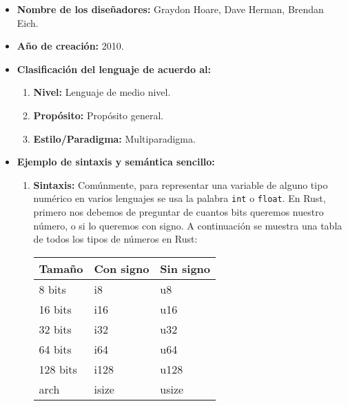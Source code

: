 \documentclass[11pt,letterpaper]{article}
\begin{document}
\begin{enumerate}
\begin{itemize}
\begin{itemize}
                  \item \textbf{Nombre de los diseñadores:} Graydon Hoare, Dave
                        Herman, Brendan Eich.
                  \item \textbf{Año de creación:} 2010.
                  \item \textbf{Clasificación del lenguaje de acuerdo al:}
                        \begin{enumerate}
                          \item \textbf{Nivel:} Lenguaje de medio nivel.
                          \item \textbf{Propósito:} Propósito general.
                          \item \textbf{Estilo/Paradigma:} Multiparadigma.
                        \end{enumerate}
                  \item \textbf{Ejemplo de sintaxis y semántica sencillo:}
                        \begin{enumerate}
                          \item \textbf{Sintaxis:} Comúnmente, para representar
                                una variable de alguno tipo numérico en varios
                                lenguajes se usa la palabra \texttt{int} o
                                \texttt{float}. En Rust, primero nos debemos de
                                preguntar de cuantos bits queremos nuestro
                                número, o si lo queremos con signo. A
                                continuación se muestra una tabla de todos los
                                tipos de números en Rust:

                                \begin{center}
                                  \begin{tabular}{lll}
                                    Tamaño & Con signo & Sin signo\\
                                    \hline
                                    8 bits & i8 & u8\\
                                    16 bits & i16 & u16\\
                                    32 bits & i32 & u32\\
                                    64 bits & i64 & u64\\
                                    128 bits & i128 & u128\\
                                    arch & isize & usize\\
                                  \end{tabular}
                                \end{center}


\end{enumerate}
\end{itemize}
\end{itemize}
\end{enumerate}
\end{document}
